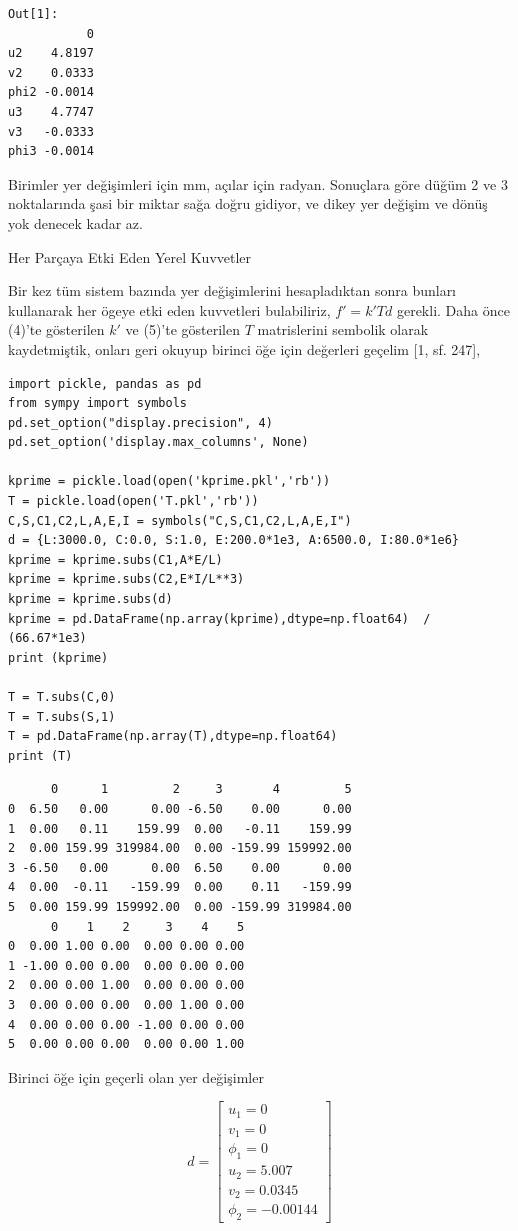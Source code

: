 \documentclass[12pt,fleqn]{article}\usepackage{../../common}
\begin{document}
\begin{verbatim}
Out[1]: 
           0
u2    4.8197
v2    0.0333
phi2 -0.0014
u3    4.7747
v3   -0.0333
phi3 -0.0014
\end{verbatim}

Birimler yer değişimleri için mm, açılar için radyan. Sonuçlara göre düğüm 2 ve
3 noktalarında şasi bir miktar sağa doğru gidiyor, ve dikey yer değişim ve dönüş
yok denecek kadar az.

Her Parçaya Etki Eden Yerel Kuvvetler

Bir kez tüm sistem bazında yer değişimlerini hesapladıktan sonra bunları
kullanarak her ögeye etki eden kuvvetleri bulabiliriz, $f' = k' T d$
gerekli. Daha önce (4)'te gösterilen $k'$ ve (5)'te gösterilen $T$ matrislerini
sembolik olarak kaydetmiştik, onları geri okuyup birinci öğe için değerleri
geçelim [1, sf. 247],

\begin{verbatim}
import pickle, pandas as pd
from sympy import symbols
pd.set_option("display.precision", 4)
pd.set_option('display.max_columns', None)

kprime = pickle.load(open('kprime.pkl','rb'))
T = pickle.load(open('T.pkl','rb'))
C,S,C1,C2,L,A,E,I = symbols("C,S,C1,C2,L,A,E,I")
d = {L:3000.0, C:0.0, S:1.0, E:200.0*1e3, A:6500.0, I:80.0*1e6}
kprime = kprime.subs(C1,A*E/L) 
kprime = kprime.subs(C2,E*I/L**3)
kprime = kprime.subs(d) 
kprime = pd.DataFrame(np.array(kprime),dtype=np.float64)  / (66.67*1e3)
print (kprime)

T = T.subs(C,0)
T = T.subs(S,1)
T = pd.DataFrame(np.array(T),dtype=np.float64)
print (T)
\end{verbatim}

\begin{verbatim}
      0      1         2     3       4         5
0  6.50   0.00      0.00 -6.50    0.00      0.00
1  0.00   0.11    159.99  0.00   -0.11    159.99
2  0.00 159.99 319984.00  0.00 -159.99 159992.00
3 -6.50   0.00      0.00  6.50    0.00      0.00
4  0.00  -0.11   -159.99  0.00    0.11   -159.99
5  0.00 159.99 159992.00  0.00 -159.99 319984.00
      0    1    2     3    4    5
0  0.00 1.00 0.00  0.00 0.00 0.00
1 -1.00 0.00 0.00  0.00 0.00 0.00
2  0.00 0.00 1.00  0.00 0.00 0.00
3  0.00 0.00 0.00  0.00 1.00 0.00
4  0.00 0.00 0.00 -1.00 0.00 0.00
5  0.00 0.00 0.00  0.00 0.00 1.00
\end{verbatim}

Birinci öğe için geçerli olan yer değişimler

$$
d = \left[\begin{array}{c}
u_1 = 0 \\ v_1 = 0 \\ \phi_1 = 0 \\ u_2 = 5.007 \\ v_2 = 0.0345 \\ \phi_2 = -0.00144
\end{array}\right]
$$
\end{document}
